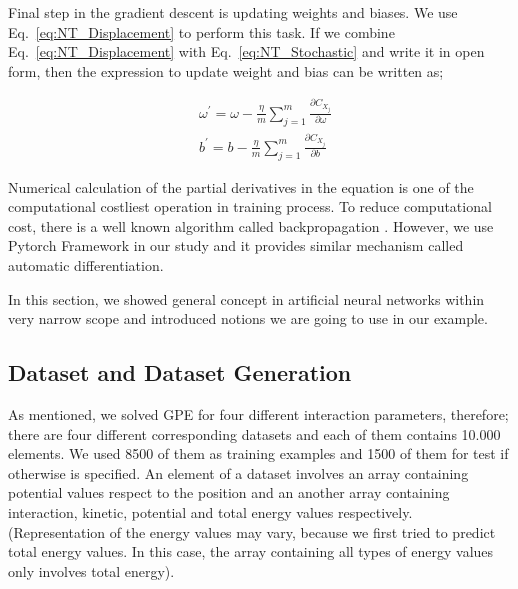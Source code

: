 \documentclass[a4paper,times,12pt]{article}
\begin{document}
Final step in the gradient descent is updating weights and biases. We use Eq.~\ref{eq:NT_Displacement} to perform this task. If we combine Eq.~\ref{eq:NT_Displacement} with Eq.~\ref{eq:NT_Stochastic} and write it in open form, then the expression to update weight and bias can be written as;

\begin{equation}
\label{eq:NT_weight_bias_update}
\begin{split}
& \omega^{\prime} = \omega - \frac{\eta}{m} \sum\limits_{j = 1}^{m} \frac{\partial{C_{X_j}}}{\partial{\omega}} \\
& b^{\prime} = b- \frac{\eta}{m} \sum\limits_{j = 1}^{m} \frac{\partial{C_{X_j}}}{\partial{b}}
\end{split}
\end{equation}

\noindent Numerical calculation of the partial derivatives in the equation is one of the computational costliest operation in training process. To reduce computational cost, there is a well known algorithm called backpropagation \cite{goodfellow2016deep}. However, we use Pytorch Framework in our study and it provides similar mechanism called automatic differentiation. 

In this section, we showed general concept in artificial neural networks within very narrow scope and introduced notions we are going to use in our example. 


\subsection{Dataset and Dataset Generation}

As mentioned, we solved GPE for four different interaction parameters, therefore; there are four different corresponding datasets and each of them contains 10.000 elements. We used 8500 of them as training examples and 1500 of them for test if otherwise is specified. An element of a dataset involves an array containing potential values respect to the position and an another array containing interaction, kinetic, potential and total energy values respectively. (Representation of the energy values may vary, because we first tried to predict total energy values. In this case, the array containing all types of energy values only involves total energy).
\end{document}
